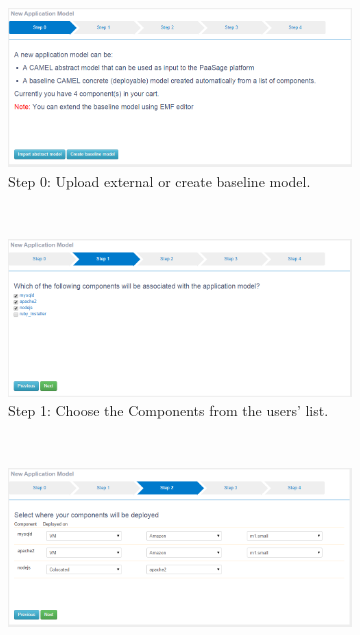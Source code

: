 \begin{figure}
\begin{subfigure}{.8\textwidth}
  \centering
  \includegraphics[scale=0.4]{./fig/model_creation0.png}
  \caption{Step 0: Upload external or create baseline model.}
  \label{fig:sfig0}
\end{subfigure} \\[1ex]
\begin{subfigure}{.8\textwidth}
  \centering
  \includegraphics[scale=0.4]{./fig/model_creation1.png}
  \caption{Step 1: Choose the Components from the users' list.}
  \label{fig:sfig1}
\end{subfigure} \\[1ex]
\begin{subfigure}{.8\textwidth}
  \centering
  \includegraphics[scale=0.4]{./fig/model_creation2.png}

\end{subfigure}
\end{figure}
